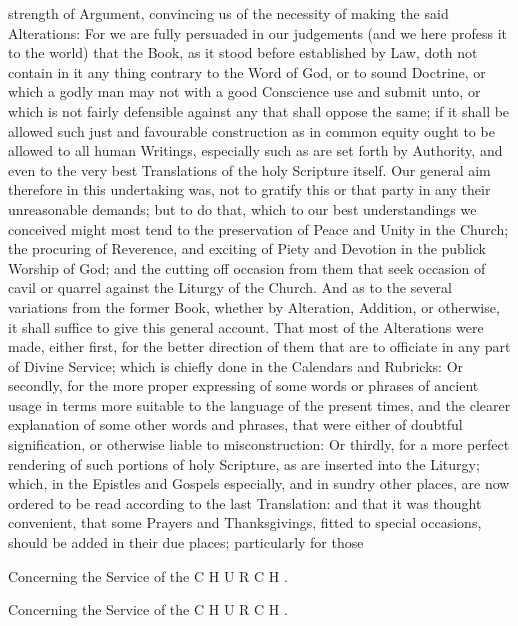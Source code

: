 strength of Argument, convincing us of the necessity of making the said Alterations: For we are fully persuaded in our judgements (and we here profess it to the world) that the Book, as it stood before established by Law, doth not contain in it any thing contrary to the Word of God, or to sound Doctrine, or which a godly man may not with a good Conscience use and submit unto, or which is not fairly defensible against any that shall oppose the same; if it shall be allowed such just and favourable construction as in common equity ought to be allowed to all human Writings, especially such as are set forth by Authority, and even to the very best Translations of the holy Scripture itself. Our general aim therefore in this undertaking was, not to gratify this or that party in any their unreasonable demands; but to do that, which to our best understandings we conceived might most tend to the preservation of Peace and Unity in the Church; the procuring of Reverence, and exciting of Piety and Devotion in the publick Worship of God; and the cutting off occasion from them that seek occasion of cavil or quarrel against the Liturgy of the Church. And as to the several variations from the former Book, whether by Alteration, Addition, or otherwise, it shall suffice to give this general account. That most of the Alterations were made, either first, for the better direction of them that are to officiate in any part of Divine Service; which is chiefly done in the Calendars and Rubricks: Or secondly, for the more proper expressing of some words or phrases of ancient usage in terms more suitable to the language of the present times, and the clearer explanation of some other words and phrases, that were either of doubtful signification, or otherwise liable to misconstruction: Or thirdly, for a more perfect rendering of such portions of holy Scripture, as are inserted into the Liturgy; which, in the Epistles and Gospels especially, and in sundry other places, are now ordered to be read according to the last Translation: and that it was thought convenient, that some Prayers and Thanksgivings, fitted to special occasions, should be added in their due places; particularly for those

Concerning the Service of the C H U R C H .

Concerning the Service of the C H U R C H .

